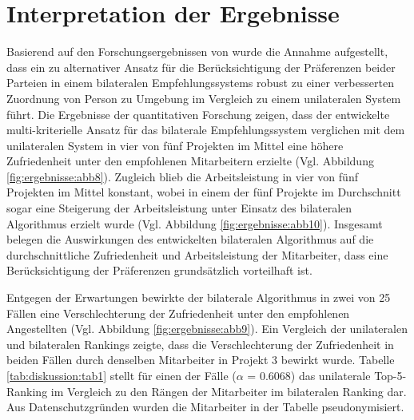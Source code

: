 \section{Interpretation der Ergebnisse}
Basierend auf den Forschungsergebnissen von \textcite[S.1 ff.]{link:booklet} wurde die Annahme aufgestellt, dass ein zu \textcite[S.1 ff.]{link:booklet} alternativer Ansatz für die Berücksichtigung der Präferenzen beider Parteien in einem bilateralen Empfehlungssystems robust zu einer verbesserten Zuordnung von Person zu Umgebung im Vergleich zu einem unilateralen System führt.
Die Ergebnisse der quantitativen Forschung zeigen, dass der entwickelte multi-kriterielle Ansatz für das bilaterale Empfehlungssystem verglichen mit dem unilateralen System in vier von fünf Projekten im Mittel eine höhere Zufriedenheit unter den empfohlenen Mitarbeitern erzielte (Vgl. Abbildung \ref{fig:ergebnisse:abb8}).
Zugleich blieb die Arbeitsleistung in vier von fünf Projekten im Mittel konstant, wobei in einem der fünf Projekte im Durchschnitt sogar eine Steigerung der Arbeitsleistung unter Einsatz des bilateralen Algorithmus erzielt wurde (Vgl. Abbildung \ref{fig:ergebnisse:abb10}).
Insgesamt belegen die Auswirkungen des entwickelten bilateralen Algorithmus auf die durchschnittliche Zufriedenheit und Arbeitsleistung der Mitarbeiter, dass eine Berücksichtigung der Präferenzen grundsätzlich vorteilhaft ist.

Entgegen der Erwartungen bewirkte der bilaterale Algorithmus in zwei von 25 Fällen eine Verschlechterung der Zufriedenheit unter den empfohlenen Angestellten (Vgl. Abbildung \ref{fig:ergebnisse:abb9}).
Ein Vergleich der unilateralen und bilateralen Rankings zeigte, dass die Verschlechterung der Zufriedenheit in beiden Fällen durch denselben Mitarbeiter in Projekt 3 bewirkt wurde.
Tabelle \ref{tab:diskussion:tab1} stellt für einen der Fälle ($\alpha$ = 0.6068) das unilaterale Top-5-Ranking im Vergleich zu den Rängen der Mitarbeiter im bilateralen Ranking dar.
Aus Datenschutzgründen wurden die Mitarbeiter in der Tabelle pseudonymisiert.

